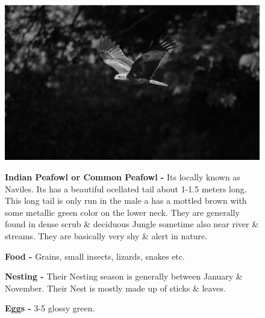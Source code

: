 \begin{figure}[H]
\begin{center}
\includegraphics{figure/Land_birds/01_pariah_kite/pariah-kite.eps}
\end{center}
\medskip
\noindent
{\bf Indian Peafowl or Common Peafowl -} Its locally known as Naviles. Its has a beautiful ocellated tail about 1-1.5 meters long. This long tail is only run in the male a has a mottled brown with some metallic green color on the lower neck. They are generally found in dense scrub \& deciduous Jungle sometime also near river \& streams. They are basically very shy \& alert in nature.

\medskip
{\bf Food -} Grains, small insects, lizards, snakes etc.

{\bf Nesting -} Their Nesting season is generally between January \& November. Their Nest is mostly made up of sticks \& leaves.

{\bf Eggs -} 3-5 glossy green.
\end{figure}

\vfill\eject

~\phantom{a}
\vfill

